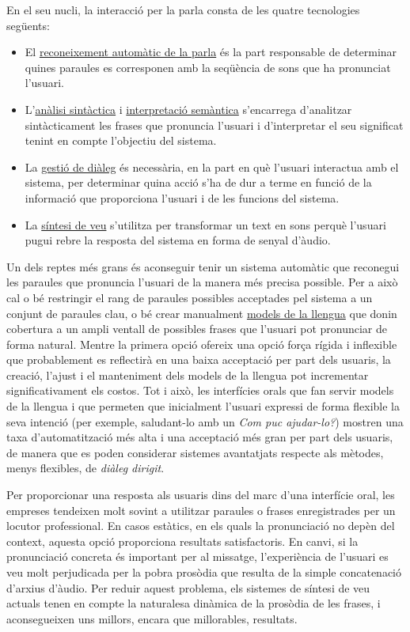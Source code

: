 \documentclass[]{../../metanetpaper}
\begin{document}
\begin{multicols}{2}
En el seu nucli, la interacció per la parla consta de les quatre tecnologies següents:
\begin{itemize}
\item El \underline{reconeixement automàtic de la parla} és la part responsable de determinar quines paraules es corresponen amb la seqüència de sons que ha pronunciat l’usuari.
\item L’\underline{anàlisi sintàctica} i \underline{interpretació semàntica} s’encarrega d’analitzar sintàcticament les frases que pronuncia l’usuari i d’interpretar el seu significat tenint en compte l’objectiu del sistema.
\item La \underline{gestió de diàleg} és necessària, en la part en què l’usuari interactua amb el sistema, per determinar quina acció s’ha de dur a terme en funció de la informació que proporciona l’usuari i de les funcions del sistema.
\item La \underline{síntesi de veu} s’utilitza per transformar un text en sons perquè l’usuari pugui rebre la resposta del sistema en forma de senyal d’àudio. 
\end{itemize}

Un dels reptes més grans és aconseguir tenir un sistema automàtic que reconegui les paraules que pronuncia l’usuari de la manera més precisa possible. Per a això cal o bé restringir el rang de paraules possibles acceptades pel sistema a un conjunt de paraules clau, o bé crear manualment \underline{models de la llengua} que donin cobertura a un ampli ventall de possibles frases que l’usuari pot pronunciar de forma natural. Mentre la primera opció ofereix una opció força rígida i inflexible que probablement es reflectirà en una baixa acceptació per part dels usuaris, la creació, l’ajust i el manteniment dels models de la llengua pot incrementar significativament els costos. Tot i això, les interfícies orals que fan servir models de la llengua i que permeten que inicialment l’usuari expressi de forma flexible la seva intenció (per exemple, saludant-lo amb un \textit{Com puc ajudar-lo?}) mostren una taxa d’automatització més alta i una acceptació més gran per part dels usuaris, de manera que es poden considerar sistemes avantatjats respecte als mètodes, menys flexibles, de \textit{diàleg dirigit}.

Per proporcionar una resposta als usuaris dins del marc d’una interfície oral, les empreses tendeixen molt sovint a utilitzar paraules o frases enregistrades per un locutor professional. En casos estàtics, en els quals la pronunciació no depèn del context, aquesta opció proporciona resultats satisfactoris. En canvi, si la pronunciació concreta és important per al missatge, l’experiència de l’usuari es veu molt perjudicada per la pobra prosòdia que resulta de la simple concatenació d’arxius d’àudio. Per reduir aquest problema, els sistemes de síntesi de veu actuals tenen en compte la naturalesa dinàmica de la prosòdia de les frases, i aconsegueixen uns millors, encara que millorables, resultats. 


\end{multicols}
\end{document}
